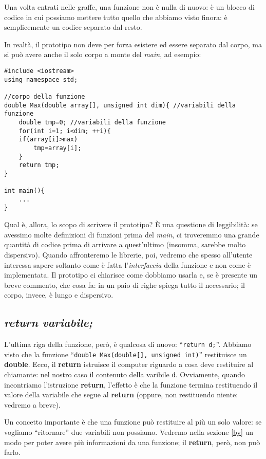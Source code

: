 Una volta entrati nelle graffe, una funzione non è nulla di nuovo: è un blocco di codice in cui possiamo mettere tutto quello che abbiamo visto finora: è semplicemente un codice separato dal resto.\

In realtà, il prototipo non deve per forza esistere ed essere separato dal corpo, ma si può  avere anche il solo corpo a monte del \emph{main}, ad esempio:

\begin{lstlisting}
#include <iostream>
using namespace std;

//corpo della funzione
double Max(double array[], unsigned int dim){ //variabili della funzione
	double tmp=0; //variabili della funzione
	for(int i=1; i<dim; ++i){
	if(array[i]>max)
		tmp=array[i];	
	}
	return tmp;
}

int main(){
	...
}
\end{lstlisting}

Qual è, allora, lo scopo di scrivere il prototipo? È una questione di leggibilità: se avessimo molte definizioni di funzioni prima del \emph{main}, ci troveremmo una grande quantità di codice prima di arrivare a quest'ultimo (insomma, sarebbe molto dispersivo). Quando affronteremo le librerie, poi, vedremo che spesso all'utente interessa sapere soltanto come è fatta l'\emph{interfaccia} della funzione e non come è implementata. Il prototipo ci chiarisce come dobbiamo usarla e, se è presente un breve commento, che cosa fa: in un paio di righe spiega tutto il necessario; il corpo, invece, è lungo e dispersivo.
\subsection{\emph{return variabile;}}
L'ultima riga della funzione, però, è qualcosa di nuovo:  ``\lstinline|return d;|''. Abbiamo visto che la funzione ``\lstinline|double Max(double[], unsigned int)|'' restituisce un \textbf{double}. Ecco, il \textbf{return} istruisce il computer riguardo a cosa deve restituire al chiamante: nel nostro caso il contenuto della varibile \verb|d|. Ovviamente, quando incontriamo l'istruzione \textbf{return}, l'effetto è che la funzione termina restituendo il valore della variabile che segue al \textbf{return} (oppure, non restituendo niente: vedremo a breve).

Un concetto importante è che una funzione può restituire al più un solo valore: se vogliamo ``ritornare'' due variabili non possiamo. Vedremo nella sezione \ref{by} un modo per poter avere più informazioni da una funzione; il \textbf{return}, però, non può farlo.

